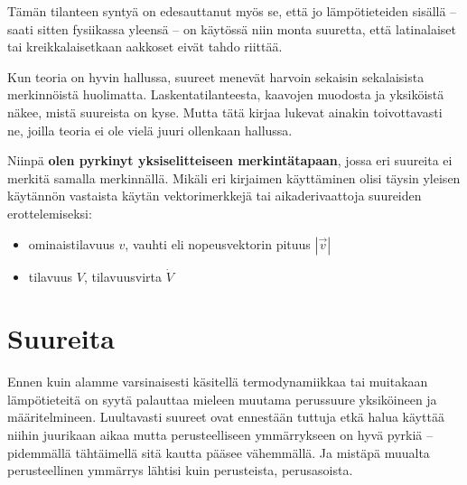 \documentclass[12pt,a4paper,finnish]{book}
\begin{document}
Tämän tilanteen syntyä on edesauttanut myös se, että jo lämpötieteiden sisällä -- saati sitten fysiikassa 
yleensä -- on käytössä niin monta suuretta, että latinalaiset tai kreikkalaisetkaan aakkoset eivät tahdo riittää.

Kun teoria on hyvin hallussa, suureet menevät harvoin sekaisin sekalaisista merkinnöistä huolimatta. 
Laskentatilanteesta, kaavojen muodosta ja yksiköistä näkee, mistä suureista on kyse. Mutta tätä kirjaa 
lukevat ainakin toivottavasti ne, joilla teoria ei ole vielä juuri ollenkaan hallussa.

Niinpä \textbf{olen pyrkinyt yksiselitteiseen merkintätapaan}, jossa eri suureita ei merkitä samalla merkinnällä. 
Mikäli eri kirjaimen käyttäminen olisi täysin yleisen käytännön vastaista käytän vektorimerkkejä 
tai aikaderivaattoja  suureiden erottelemiseksi:
 
\begin{itemize}
 \item ominaistilavuus $v$, vauhti eli nopeusvektorin pituus $|\vec{v}|$
 \item tilavuus $V$, tilavuusvirta $\dot{V}$
\end{itemize}

\renewcommand{\thepart}{\arabic{part}}
\setcounter{part}{-1}
\part{Suureita} %
\setcounter{chapter}{0}
\renewcommand{\thesection}{\arabic{chapter}.\arabic{section}}

Ennen kuin alamme varsinaisesti käsitellä termodynamiikkaa tai muitakaan lämpötieteitä on syytä palauttaa mieleen 
muutama perussuure yksiköineen ja määritelmineen. Luultavasti suureet ovat ennestään tuttuja etkä halua käyttää 
niihin juurikaan aikaa mutta perusteelliseen ymmärrykseen on hyvä pyrkiä -- pidemmällä tähtäimellä sitä kautta 
pääsee vähemmällä. Ja mistäpä muualta perusteellinen ymmärrys lähtisi kuin perusteista, perusasoista.

% 
\end{document}
